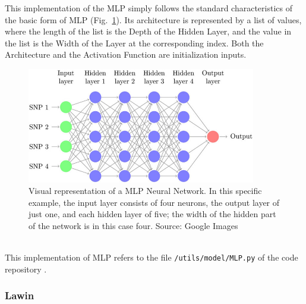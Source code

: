 This implementation of the MLP simply follows the standard characteristics of the basic form of MLP (Fig.~\ref{fig:figure-3.4.1}).
Its architecture is represented by a list of values, where the length of the list is the Depth of the Hidden Layer, and the value in the list is the Width of the Layer at the corresponding index.
Both the Architecture and the Activation Function are initialization inputs.
\begin{figure}[t]
	\centering
	\includegraphics[width=10cm]{figures/figure-3.4.1.png}
	\caption[Visual Example Representation of MLP]{Visual representation of a MLP Neural Network. In this specific example, the input layer consists of four neurons, the output layer of just one, and each hidden layer of five; the width of the hidden part of the network is in this case four. Source: Google Images}
	\label{fig:figure-3.4.1}
\end{figure}
\\[0.3cm]This implementation of MLP refers to the file \texttt{/utils/model/MLP.py} of the code repository \cite{Repository-THESIS}.

\subsubsection{Lawin}\label{sec:Lawin-3.4.1.2}

